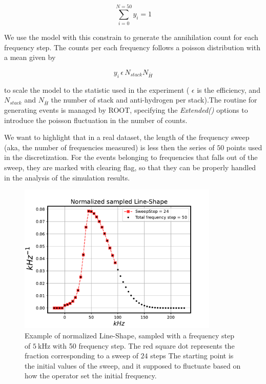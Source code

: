 \documentclass[11pt,a4paper,oneside]{article}
\begin{document}
\begin{equation}
\sum_{i = 0}^{N = 50} y_{i} = 1
\end{equation}

We use the model with this constrain to generate the annihilation count for each frequency step. The counts per each frequency follows a poisson distribution with a mean given by

\begin{equation*}
y_{i} \, \epsilon \, N_{stack} N_{\overline{H}}  
\end{equation*}

to scale the model to the statistic used in the experiment ( $\epsilon$ is the efficiency, and $N_{stack}$ and $N_{\overline{H}}$ the number of stack and anti-hydrogen per stack).The routine for generating events is managed by ROOT, specifying the \textit{Extended()} options to introduce the poisson fluctuation in the number of counts.  

We want to highlight that in a real dataset, the length of the frequency sweep (aka, the number of frequencies measured) is less then the series of $50$ points used in the discretization. For the events belonging to frequencies that falls out of the sweep, they are marked with clearing flag, so that they can be properly handled in the analysis of the simulation results.

\begin{figure}[!hbtp]
\centering
\includegraphics[width=0.85\textwidth]{Normalized.pdf}
\caption{Example of normalized Line-Shape, sampled with a frequency step of $\SI{5}{\kilo \hertz}$ with 50 frequency step. The red square dot represents the fraction corresponding to a sweep of $24$ steps The starting point is the initial values of the sweep, and it supposed to fluctuate based on how the operator set the initial frequency.}
\end{figure}
\end{document}

